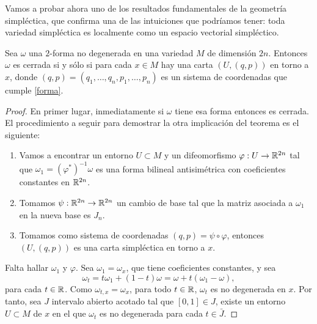 Vamos a probar ahora uno de los resultados fundamentales de la geometría simpléctica, que confirma una de las intuiciones que podríamos tener: toda variedad simpléctica es localmente como un espacio vectorial simpléctico.

\begin{thm}[Darboux]
  Sea $\omega$ una $2$-forma no degenerada en una variedad $M$ de dimensión $2n$. Entonces $\omega$ es cerrada si y sólo si para cada $x\in M$ hay una carta $(U,(q,p))$ en torno a $x$, donde $(q,p)=(q_1,\dots,q_n,p_1,\dots,p_n)$ es un sistema de coordenadas que cumple \eqref{forma}. 
\end{thm}
\begin{proof}
  En primer lugar, inmediatamente si $\omega$ tiene esa forma entonces es cerrada. El procedimiento a seguir para demostrar la otra implicación del teorema es el siguiente:
  \begin{enumerate}
    \item Vamos a encontrar un entorno $U \subset M$ y un difeomorfismo $\varphi : U \rightarrow \mathbb{R}^{2n}$ tal que $\omega_1= (\varphi^*)^{-1}\omega$ es una forma bilineal antisimétrica con coeficientes constantes en $\mathbb{R}^{2n}$.
    \item Tomamos $\psi: \mathbb{R}^{2n} \rightarrow \mathbb{R}^{2n}$ un cambio de base tal que la matriz asociada a $\omega_1$ en la nueva base es $J_n$. 
    \item Tomamos como sistema de coordenadas $(q,p)=\psi \circ \varphi$, entonces $(U,(q,p))$ es una carta simpléctica en torno a $x$.
  \end{enumerate}

\begin{center}
\end{center}

  Falta hallar $\omega_1$ y $\varphi$. Sea $\omega_1=\omega_x$, que tiene coeficientes constantes, y sea
  \begin{equation*}
    \omega_t=t\omega_1 + (1-t) \omega = \omega + t(\omega_1-\omega),
  \end{equation*}
  para cada $t\in \mathbb{R}$. Como $\omega_{t,x}=\omega_x$, para todo $t \in \mathbb{R}$, $\omega_t$ es no degenerada en $x$. Por tanto, sea $J$ intervalo abierto acotado tal que $[0,1]\in J$, existe un entorno $U \subset M$ de $x$ en el que $\omega_t$ es no degenerada para cada $t\in \bar{J}$.


\end{proof}
